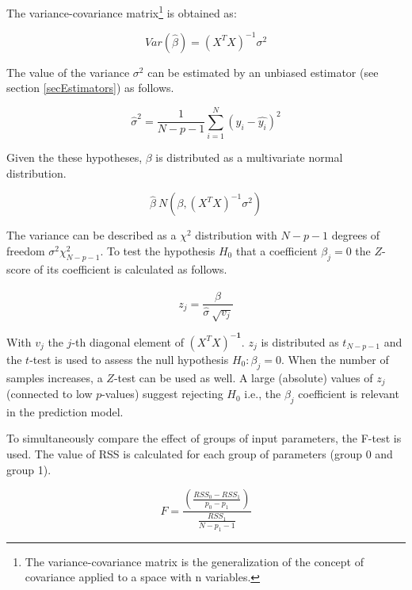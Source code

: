The variance-covariance matrix\footnote{The variance-covariance matrix is the generalization of the concept of covariance applied to a space with n variables.} is obtained as:

\begin{equation}
Var\left(\hat{\beta}\right)=\left(X^TX\right)^{-1}\sigma^2
\label{eq_OLSgeo5}
\end{equation}

The value of the variance $\sigma^2$ can be estimated by an unbiased estimator (see section \ref{secEstimators}) as follows.

\begin{equation}
{\hat{\sigma}}^2=\frac{1}{N-p-1}\sum_{i=1}^{N}\left(y_i-\widehat{y_i}\right)^2
\label{eq_OLSgeo6}
\end{equation}

Given the these hypotheses, $\beta$ is distributed as a multivariate normal distribution.

\begin{equation}
\hat{\beta}~N(\beta,\left(X^TX\right)^{-1}\sigma^2)
\label{eq_OLSgeo7}
\end{equation}

The variance can be described as a $\chi^2$ distribution with $N-p-1$ degrees of freedom $\sigma^2\chi_{N-p-1}^2$. To test the hypothesis $H_0$ that a coefficient $\beta_j=0$ the $Z$-score of its coefficient is calculated as follows.

\begin{equation}
z_j=\frac{\hat{\beta}}{\hat{\sigma}\ \sqrt{v_j}}
\label{eq_OLSgeo8}
\end{equation}

With $v_j$ the $j$-th diagonal element of $\left({X}^{T}{X}\right)^{-\mathbf{1}}$. $z_j$ is distributed as $t_{N-p-1}$ and the $t$-test is used to assess the null hypothesis $H_0:\beta_j = 0$. When the number of samples increases, a $Z$-test can be used as well. A large (absolute) values of $z_j$ (connected to low $p$-values) suggest rejecting $H_0$ i.e., the $\beta_j$ coefficient is relevant in the prediction model.\par

To simultaneously compare the effect of groups of input parameters, the F-test is used. The value of RSS is calculated for each group of parameters (group 0 and group 1).

\begin{equation}
F=\frac{\left(\frac{{RSS}_0-{RSS}_1}{p_0-p_1}\right)}{\frac{RSS_1}{N-p_1-1}}
\label{eq_OLSgeo9}
\end{equation}

